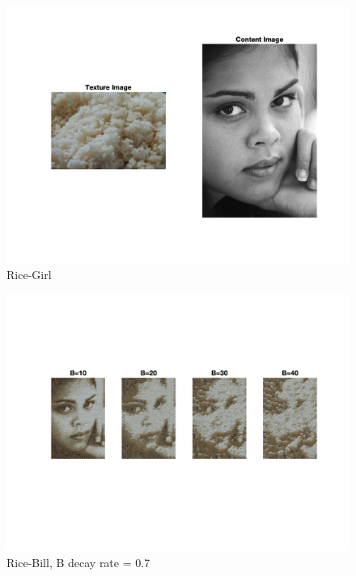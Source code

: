 \documentclass[10pt,twocolumn,letterpaper]{article}
\begin{document}
\begin{figure}[h]
    \begin{center}
    \includegraphics[trim={2cm 4cm 2cm 2cm}, clip, scale=0.5]{../results/bsize/inp_rice_girl.png}
    \end{center}
    \vspace{-0.2em}
    \caption{Rice-Girl}
    \label{fig:rice_girl}
\end{figure}

\begin{figure}[h]
    \begin{center}
    \includegraphics[trim={2cm 6cm 2cm 4cm}, clip, scale=0.9]{../results/bsize/res_rice_girl_bdr_0_700000_iter_5.png}
    \end{center}
    \vspace{-0.2em}
    \caption{Rice-Bill, B decay rate = 0.7}
    \label{fig:rice_girl_bs}
\end{figure}
\end{document}
